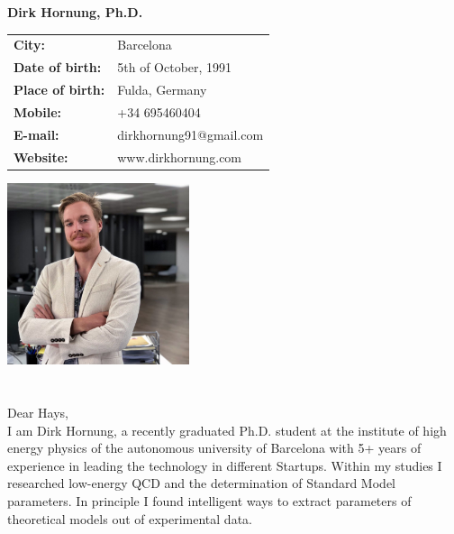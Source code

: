 \documentclass[11pt]{article}
\begin{document}
\Large
\noindent
\textbf{Dirk Hornung, Ph.D.} \\

\normalsize
\noindent
\begin{minipage}{0.5\linewidth}
  \begin{tabularx}{0.6\textwidth}{>{\bfseries}l l}
    City:           & Barcelona \\
    Date of birth:  & 5th of October, 1991\\
    Place of birth: & Fulda, Germany \\
    Mobile:         & +34 695460404 \\
    E-mail:         & dirkhornung91@gmail.com \\
    Website:      	& www.dirkhornung.com
  \end{tabularx}
\end{minipage}
\begin{minipage}{0.5\linewidth}
  \begin{flushright}
    \includegraphics[width=0.4\textwidth]{dirk.png}
  \end{flushright}
\end{minipage}

\section*{}
\vspace{1cm}
Dear Hays, \\

\noindent I am Dirk Hornung, a recently graduated Ph.D. student at the
institute of high energy physics of the autonomous university of Barcelona with
5+ years of experience in leading the technology in different Startups. Within
my studies I researched low-energy QCD and the determination of Standard
Model parameters. In principle I found intelligent ways to extract parameters of
theoretical models out of experimental data. \\
\end{document}
